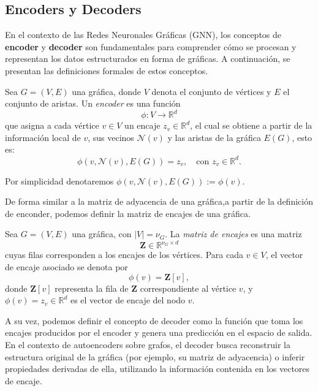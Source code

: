 \subsection{Encoders y Decoders}
En el contexto de las Redes Neuronales Gráficas (GNN), los conceptos de \textbf{encoder} y \textbf{decoder} son fundamentales para comprender cómo se procesan y representan los datos estructurados en forma de gráficas. A continuación, se presentan las definiciones formales de estos conceptos.

\begin{definition}[Encoder]
    Sea $G = (V, E)$ una gráfica, donde $V$ denota el conjunto de vértices y $E$ el conjunto de aristas.
    Un \emph{encoder} es una función
    \[
        \phi : V \longrightarrow \mathbb{R}^d
    \]
    que asigna a cada vértice $v \in V$ un encaje $z_v \in \mathbb{R}^d$, el cual se obtiene a partir de la información local de $v$, sus vecinos $\mathcal{N}(v)$ y las aristas de la gráfica $E(G)$, esto es:
    \[
        \phi(v, \mathcal{N}(v), E(G)) = z_v, \quad \text{con } z_v \in \mathbb{R}^d.
    \]
\end{definition}


Por simplicidad denotaremos $\phi(v,\mathcal{N}(v),E(G)) :=\phi(v)$.

De forma similar a la matriz de adyacencia de una gráfica,a partir de la definición de enconder, podemos definir la matriz de encajes de una gráfica.

\begin{definition}
    Sea $G = (V, E)$ una gráfica, con $|V| = \nu_G$.
    La \emph{matriz de encajes} es una matriz
    \[
        \mathbf{Z} \in \mathbb{R}^{\nu_G \times d}
    \]
    cuyas filas corresponden a los encajes de los vértices.
    Para cada $v \in V$, el vector de encaje asociado se denota por
    \[
        \phi(v) = \mathbf{Z}[v],
    \]
    donde $\mathbf{Z}[v]$ representa la fila de $\mathbf{Z}$ correspondiente al vértice $v$, y $\phi(v) = z_v \in \mathbb{R}^d$ es el vector de encaje del nodo $v$.
\end{definition}

A su vez, podemos definir el concepto de decoder como la función que toma los encajes producidos por el encoder y genera una predicción en el espacio de salida.
En el contexto de autoencoders sobre grafos, el decoder busca reconstruir la estructura original de la gráfica (por ejemplo, su matriz de adyacencia) o inferir propiedades derivadas de ella, utilizando la información contenida en los vectores de encaje.

